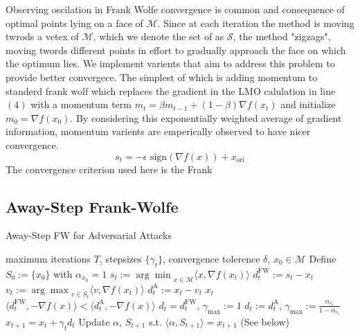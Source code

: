 \documentclass{article}
\begin{document}
Observing oscilation in Frank Wolfe convergence is common and consequence of optimal points lying on a face of $\mathcal{M}$. Since at each iteration the method is moving twrods a vetex of $\mathcal{M}$, which we denote the set of as $\mathcal{S}$, the method "zigzags", moving twords different points in effort to gradually approach the face on which the optimum lies. We implement varients that aim to address this problem to provide better convergece. The simplest of which is adding momentum to standerd frank wolf which replaces the gradient in the LMO calulation in line $(4)$ with a momentum term $m_t  = \beta m_{t-1} + (1-\beta) \nabla f(x_t)$ and initialize $m_0 = \nabla f(x_0)$. By considering this exponentially weighted average of gradient information, momentum varients are emperically observed to have nicer convergence. 
$$s_t = -\epsilon \text{ sign}(\nabla f(x)) +  x_\text{ori}$$
The convergence criterion used here is the Frank
\subsection{Away-Step Frank-Wolfe}
\begin{algorithm}
\caption{Away-Step FW for Adversarial Attacks}\label{alg:cap}
\begin{algorithmic}[1]
\Require maximum iterations $T$, stepsizes $\{\gamma_t\}$, convergence tolerence $\delta$, $x_0 \in \mathcal{M}$
\State Define $S_0 := \{x_0\}$ with $\alpha_{x_0} = 1$
	\State $s_t  := {\arg \min}_{x\in\mathcal{M}} \langle x, \nabla f(x_t)\rangle$ 
	\State $d_t^{\text{FW}} := s_t - x_t$
	\State $v_t  := {\arg \max}_{v\in S_t} \langle v, \nabla f(x_t)\rangle$
	\State $d_t^{\text{A}} := x_t - v_t$
	  $x_t$ \hfill {}
	\EndIf
	\If $\langle d_t^\text{FW}, -\nabla f(x)\rangle < \langle d_t^\text{A}, -\nabla f(x)\rangle$
		\State $d_t = d_t^\text{FW}$, $\gamma_\text{max} := 1$
	\Else
		\State $d_t := d_t^\text{A}$, $\gamma_\text{max} := \frac{\alpha_{v_t}}{1- \alpha_{v_t}}$
	\EndIf
	\State $x_{t+1} = x_t + \gamma_t d_t$
	\State Update $\alpha$, $S_{t+1}$ s.t. $\langle \alpha, S_{t+1}\rangle = x_{t+1}$ (See below)
\EndFor
\end{algorithmic}
\end{algorithm}
\end{document}
